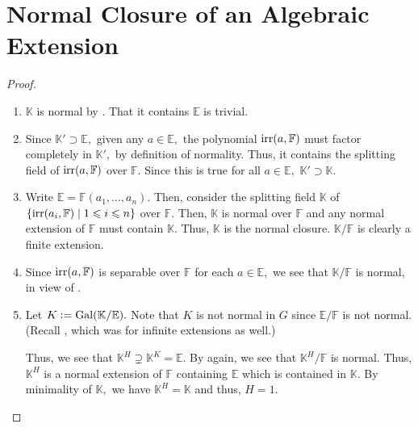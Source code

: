 \section{Normal Closure of an Algebraic Extension}
\normalclosureproperties*\label{prop:normalclosureproperties2}
\begin{flushright}\hyperref[prop:normalclosureproperties]{\upsym}\end{flushright}
\begin{proof}
    \phantom{hi}
    \begin{enumerate}[leftmargin=*]
        \item $\mathbb{K}$ is normal by . That it contains $\mathbb{E}$ is trivial.
        \item Since $\mathbb{K}' \supset \mathbb{E},$ given any $a \in \mathbb{E},$ the polynomial $\operatorname{irr}(a, \mathbb{F})$ must factor completely in $\mathbb{K}',$ by definition of normality. Thus, it contains the splitting field of $\operatorname{irr}(a, \mathbb{F})$ over $\mathbb{F}.$ Since this is true for all $a \in \mathbb{E},$ $\mathbb{K}' \supset \mathbb{K}.$
        \item Write $\mathbb{E} = \mathbb{F}(a_1, \ldots, a_n).$ Then, consider the splitting field $\mathbb{K}$ of $\{\operatorname{irr}(a_i, \mathbb{F}) \mid 1 \leqslant i \leqslant n\}$ over $\mathbb{F}.$ Then, $\mathbb{K}$ is normal over $\mathbb{F}$ and any normal extension of $\mathbb{F}$ must contain $\mathbb{K}.$ Thus, $\mathbb{K}$ is the normal closure. $\mathbb{K}/\mathbb{F}$ is clearly a finite extension.
        \item Since $\operatorname{irr}(a, \mathbb{F})$ is separable over $\mathbb{F}$ for each $a \in \mathbb{E},$ we see that $\mathbb{K}/\mathbb{F}$ is normal, in view of .
        \item Let $K \vcentcolon= \operatorname{Gal}(\mathbb{K}/\mathbb{E}).$ Note that $K$ is not normal in $G$ since $\mathbb{E}/\mathbb{F}$ is not normal. (Recall , which was for infinite extensions as well.)

        Thus, we see that $\mathbb{K}^H \supsetneq \mathbb{K}^K = \mathbb{E}.$ By  again, we see that $\mathbb{K}^H/\mathbb{F}$ is normal. Thus, $\mathbb{K}^H$ is a normal extension of $\mathbb{F}$ containing $\mathbb{E}$ which is contained in $\mathbb{K}.$ By minimality of $\mathbb{K},$ we have $\mathbb{K}^H = \mathbb{K}$ and thus, $H = 1.$ \qedhere
    \end{enumerate}
\end{proof}

